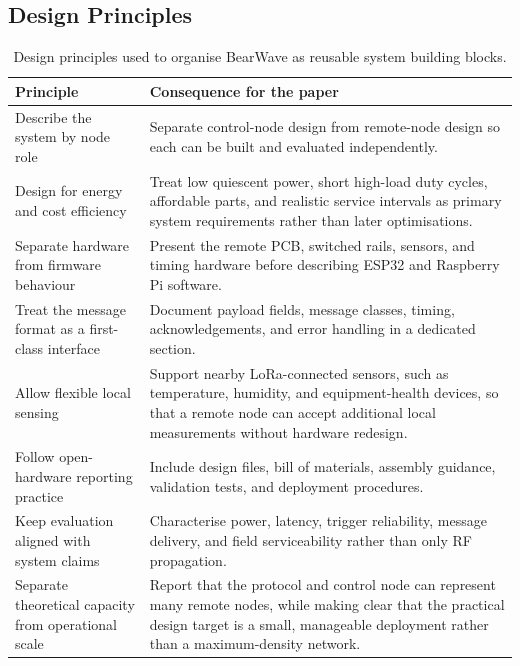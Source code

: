 \documentclass[acmsmall,screen]{acmart}
\begin{document}
\subsection{Design Principles}
\begin{table}[tbp]
\centering
\caption{Design principles used to organise BearWave as reusable system building blocks.}
\label{tab:design-principles}
\begin{tabularx}{\textwidth}{p{}X}
\toprule
Principle & Consequence for the paper \\
\midrule
Describe the system by node role & Separate control-node design from remote-node design so each can be built and evaluated independently. \\
Design for energy and cost efficiency & Treat low quiescent power, short high-load duty cycles, affordable parts, and realistic service intervals as primary system requirements rather than later optimisations. \\
Separate hardware from firmware behaviour & Present the remote PCB, switched rails, sensors, and timing hardware before describing ESP32 and Raspberry Pi software. \\
Treat the message format as a first-class interface & Document payload fields, message classes, timing, acknowledgements, and error handling in a dedicated section. \\
Allow flexible local sensing & Support nearby LoRa-connected sensors, such as temperature, humidity, and equipment-health devices, so that a remote node can accept additional local measurements without hardware redesign. \\
Follow open-hardware reporting practice & Include design files, bill of materials, assembly guidance, validation tests, and deployment procedures. \\
Keep evaluation aligned with system claims & Characterise power, latency, trigger reliability, message delivery, and field serviceability rather than only RF propagation. \\
Separate theoretical capacity from operational scale & Report that the protocol and control node can represent many remote nodes, while making clear that the practical design target is a small, manageable deployment rather than a maximum-density network. \\
\bottomrule
\end{tabularx}
\end{table}
\end{document}
